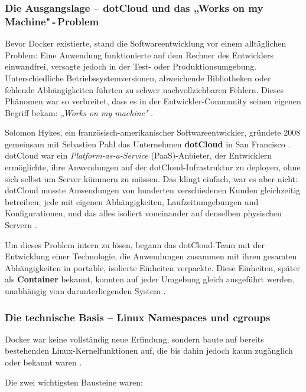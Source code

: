 \subsubsection{Die Ausgangslage – dotCloud und das „Works on my Machine"\,\mbox{-}\,Problem}

Bevor Docker existierte, stand die Softwareentwicklung vor einem alltäglichen 
Problem: Eine Anwendung funktionierte auf dem Rechner des Entwicklers 
einwandfrei, versagte jedoch in der Test- oder Produktionsumgebung. 
Unterschiedliche Betriebssystemversionen, abweichende Bibliotheken oder 
fehlende Abhängigkeiten führten zu schwer nachvollziehbaren Fehlern. 
Dieses Phänomen war so verbreitet, dass es in der Entwickler-Community 
seinen eigenen Begriff bekam: \textit{„Works on my machine"} 
\cite{ionos_docker}.

Solomon Hykes, ein französisch-amerikanischer Softwareentwickler, 
gründete 2008 gemeinsam mit Sebastien Pahl das Unternehmen 
\textbf{dotCloud} in San Francisco \cite{datacenter_docker}. dotCloud 
war ein \textit{Platform-as-a-Service} (PaaS)-Anbieter, der Entwicklern ermöglichte, 
ihre Anwendungen auf der dotCloud-Infrastruktur zu deployen, ohne sich 
selbst um Server kümmern zu müssen. Das klingt einfach, war es aber 
nicht: dotCloud musste Anwendungen von hunderten verschiedenen Kunden 
gleichzeitig betreiben, jede mit eigenen Abhängigkeiten, Laufzeitumgebungen 
und Konfigurationen, und das alles isoliert voneinander auf denselben 
physischen Servern \cite{datacenter_docker}.

Um dieses Problem intern zu lösen, begann das dotCloud-Team mit der 
Entwicklung einer Technologie, die Anwendungen zusammen mit ihren 
gesamten Abhängigkeiten in portable, isolierte Einheiten verpackte. 
Diese Einheiten, später als \textbf{Container} bekannt, konnten auf 
jeder Umgebung gleich ausgeführt werden, unabhängig vom darunterliegenden 
System \cite{ionos_docker}.

\subsubsection{Die technische Basis – Linux Namespaces und cgroups}

Docker war keine vollständig neue Erfindung, sondern baute auf bereits 
bestehenden Linux-Kernelfunktionen auf, die bis dahin jedoch kaum 
zugänglich oder bekannt waren \cite{ionos_docker}.

Die zwei wichtigsten Bausteine waren:

